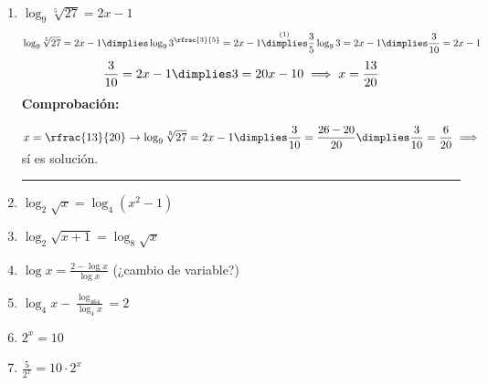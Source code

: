 \documentclass[palatino,nosec,nochap]{Docencia}
\begin{document}
\begin{enumerate}
	\vspace{0.5cm}\hrule 
	\item $\displaystyle \log_9\sqrt[5]{27} = 2x-1$
	\[
		\displaystyle \log_9\sqrt[5]{27} = 2x-1 \dimplies \log_93^{\rfrac{3}{5}} = 2x-1 \overset{(1)}{\dimplies} \frac{3}{5}\log_93=2x-1 \dimplies \frac{3}{10} = 2x-1
	\]
	\[
 		\frac{3}{10} = 2x-1 \dimplies 3=20x-10 \implies x=\frac{13}{20}
	\]
	\textbf{Comprobación:}

	\subitem $x=\displaystyle\rfrac{13}{20} \to \log_9\sqrt[5]{27} = 2x-1 \dimplies \frac{3}{10} = \frac{26-20}{20} \dimplies \frac{3}{10} = \frac{6}{20} \implies$ sí es solución.

	\vspace{0.5cm}\hrule 
	\item $\displaystyle \log_2\sqrt{x} = \log_4{(x^2-1)}$
	\vspace{1cm}
	\item $\displaystyle \log_2\sqrt{x+1} = \log_8\sqrt{x}$
	\vspace{1cm}
	\item $\displaystyle \log x=\frac{2-\log x}{\log x}$ (¿cambio de variable?)
	\vspace{1cm}
	\item $\displaystyle \log_4 x - \frac{\log_464}{\log_4x} = 2$
	\vspace{1cm}
	\item $\displaystyle 2^x = 10$
	\vspace{1cm}
	\item $\displaystyle \frac{5}{2^x} = 10·2^x$
\end{enumerate}
\end{document}
